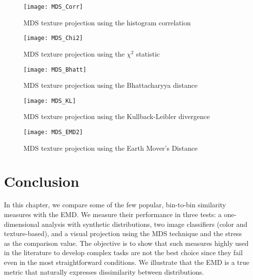 \begin{figure}[!ht]
 \centering    
 \texttt{[image: MDS\_Corr]}
 \caption{MDS texture projection using the histogram correlation}
 \label{fig:MDS_Corr} 
\end{figure}

\begin{figure}[!ht]
 \centering    
 \texttt{[image: MDS\_Chi2]}
 \caption{MDS texture projection using the $\chi^2$ statistic}
 \label{fig:MDS_Chi2} 
\end{figure}

\begin{figure}[!ht]
 \centering    
 \texttt{[image: MDS\_Bhatt]}
 \caption{MDS texture projection using the Bhattacharyya distance}
 \label{fig:MDS_Bhatt} 
\end{figure}

\begin{figure}[!ht]
 \centering    
 \texttt{[image: MDS\_KL]}
 \caption{MDS texture projection using the Kullback-Leibler divergence}
 \label{fig:MDS_KL} 
\end{figure}

\begin{figure}[!ht]
 \centering    
 \texttt{[image: MDS\_EMD2]}
 \caption{MDS texture projection using the Earth Mover's Distance}
 \label{fig:MDS_EMD} 
\end{figure}

\section{Conclusion}\label{sec:conclusions}

In this chapter, we compare some of the few popular, bin-to-bin similarity measures with the EMD. We measure their performance in three tests: a one-dimensional analysis with synthetic distributions, two image classifiers (color and texture-based), and a visual projection using the MDS technique and the stress as the comparison value. The objective is to show that such measures highly used in the literature to develop complex tasks are not the best choice since they fail even in the most straightforward conditions. We illustrate that the EMD is a true metric \citep{Peyre.Cuturi:arXiv:2018} that naturally expresses dissimilarity between distributions.

